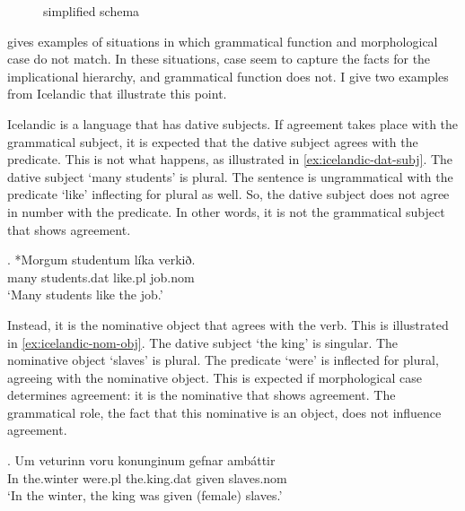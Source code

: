 \begin{figure}[ht]
  \centering
  \label{fig:agr-nom-acc-dat}
  \caption{ simplified schema}
\end{figure}

\citeauthor{bobaljik2006} gives examples of situations in which grammatical function and morphological case do not match. In these situations, case seem to capture the facts for the implicational hierarchy, and grammatical function does not. I give two examples from Icelandic that illustrate this point.

Icelandic is a language that has dative subjects. If agreement takes place with the grammatical subject, it is expected that the dative subject agrees with the predicate. This is not what happens, as illustrated in \ref{ex:icelandic-dat-subj}. The dative subject  `many students' is plural. The sentence is ungrammatical with the predicate  `like' inflecting for plural as well. So, the dative subject does not agree in number with the predicate. In other words, it is not the grammatical subject that shows agreement.

\exg. *Morgum studentum líka verkið.\\
 many students.\ac{dat} like.\ac{pl} job.\ac{nom} \\
`Many students like the job.' \label{ex:icelandic-dat-subj}

Instead, it is the nominative object that agrees with the verb. This is illustrated in \ref{ex:icelandic-nom-obj}. The dative subject  `the king' is singular. The nominative object  `slaves' is plural. The predicate  `were' is inflected for plural, agreeing with the nominative object. This is expected if morphological case determines agreement: it is the nominative that shows agreement. The grammatical role, the fact that this nominative is an object, does not influence agreement.

\exg. Um veturinn voru konunginum gefnar ambáttir\\
In the.winter were.\ac{pl} the.king.\ac{dat} given slaves.\ac{nom}\\
`In the winter, the king was given (female) slaves.' \label{ex:icelandic-nom-obj}

